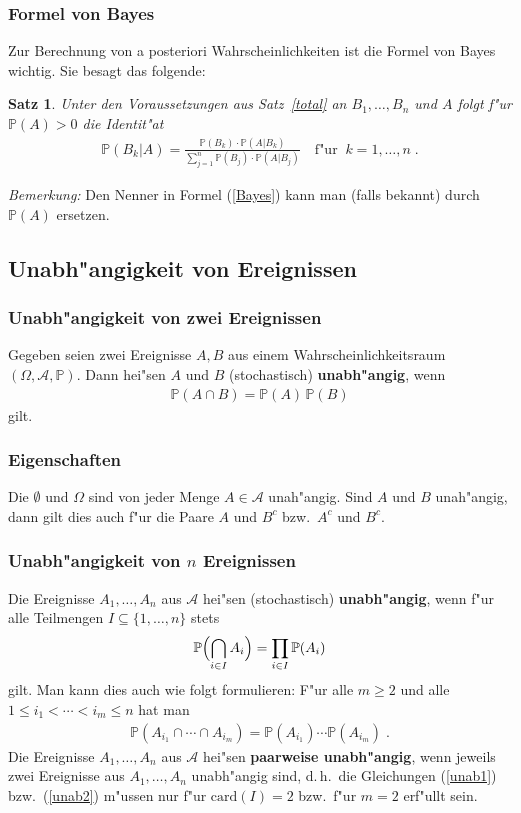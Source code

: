\documentclass[ngerman,draft,parskip=half,twoside]{scrartcl}
\newtheorem{thm}{Satz}[section]
\newcommand*{\Algeb}{\mathcal{A}}   %
\newcommand*{\WKM}{\mathbb{P}}      %
\begin{document}
\subsubsection{Formel von Bayes}
Zur Berechnung von a posteriori Wahrscheinlichkeiten ist die Formel von
Bayes wichtig. Sie besagt das folgende:
\begin{thm}
Unter den Voraussetzungen aus Satz~\ref{total} an $B_1,\ldots,B_n$ und $A$ folgt
f"ur
$\WKM(A)>0$ die Identit"at
\begin{gather}
\label{Bayes}
\WKM(B_k|A)=\frac{\WKM(B_k)\cdot\WKM(A|B_k)}{\sum_{j=1}^n
\WKM(B_j)\cdot\WKM(A|B_j)}\quad\mbox{f"ur}\;\;k=1,\ldots,n\;.
\end{gather}
\end{thm}
\textit{Bemerkung:} Den Nenner in Formel (\ref{Bayes}) kann man (falls bekannt) durch $\WKM(A)$
ersetzen.
\subsection{Unabh"angigkeit von Ereignissen}
\subsubsection{Unabh"angigkeit von zwei Ereignissen}
Gegeben seien zwei Ereignisse $A,B$ aus einem Wahrscheinlichkeitsraum $(\Omega,\Algeb,\WKM)$.
Dann hei"sen $A$ und $B$ (stochastisch) \textbf{unabh"angig}, wenn
\begin{gather*}
  \WKM(A\cap B)=\WKM(A)\,\WKM(B)
\end{gather*}
gilt.
\subsubsection{Eigenschaften}
Die $\emptyset$ und $\Omega$ sind von jeder Menge $A\in\Algeb$ unah"angig. Sind
$A$ und $B$ unah"angig, dann gilt dies auch f"ur die Paare $A$ und $B^c$ bzw.~$A^c$ und $B^c$.
\subsubsection{Unabh"angigkeit von $n$ Ereignissen}
Die Ereignisse $A_1,\ldots,A_n$ aus $\Algeb$ hei"sen (stochastisch) \textbf{unabh"angig},
wenn f"ur alle Teilmengen $I\subseteq\{1,\ldots,n\}$ stets
\begin{gather}
\label{unab1}
\WKM\Bigl(\bigcap_{i\in I} A_i\Bigr)= \prod_{i\in I}\WKM(A_i)
\end{gather}
gilt. Man kann dies auch wie folgt formulieren: F"ur alle $m\ge 2$ und alle
$1\le i_1<\cdots<i_m\le n$ hat man
\begin{gather}
\label{unab2}
\WKM(A_{i_1}\cap\cdots\cap A_{i_m})= \WKM(A_{i_1})\cdots\WKM(A_{i_m})\;.
\end{gather}
Die Ereignisse $A_1,\ldots,A_n$ aus $\Algeb$ hei"sen \textbf{paarweise unabh"angig}, wenn
jeweils zwei Ereignisse aus $A_1,\ldots,A_n$ unabh"angig sind, d.\,h.~die Gleichungen
(\ref{unab1}) bzw.~(\ref{unab2}) m"ussen nur f"ur $\mathrm{card}(I)=2$ bzw.~f"ur $m=2$ erf"ullt sein.
\end{document}
